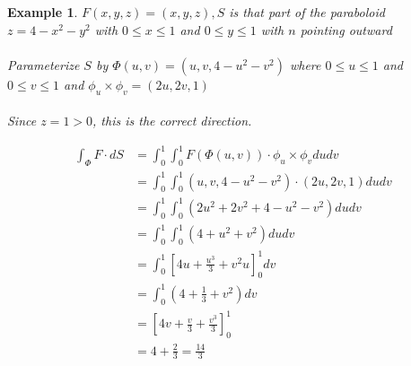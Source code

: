 \documentclass[12pt]{article}
\theoremstyle{plain}
\newtheorem{example}[theorem]{Example}
\theoremstyle{definition}
\begin{document}
\begin{example}
	$F(x,y,z) = (x,y,z), S$ is that part of the paraboloid $z=4-x^2-y^2$ with $0 \leq x \leq 1$ and $0 \leq y \leq 1$ with $n$ pointing outward\\
	\\
	Parameterize $S$ by $\Phi (u,v) = (u,v, 4-u^2-v^2)$ where $0 \leq u \leq 1$ and $0 \leq v \leq 1$ and $\phi_u \times \phi_v = (2u, 2v, 1)$\\
	\\
	Since $z=1 > 0$, this is the correct direction.

	\begin{align*}
		\int_\Phi F \cdot dS &= \int_0^1 \int_0^1 F(\Phi (u,v)) \cdot \phi_u \times \phi_v dudv\\
		&= \int_0^1 \int_0^1 (u,v,4-u^2-v^2) \cdot (2u, 2v, 1) dudv\\
		&= \int_0^1 \int_0^1 (2u^2 + 2v^2 + 4-u^2-v^2)dudv\\
		&= \int_0^1 \int_0^1 (4+u^2+v^2) dudv\\
		&= \int_0^1 [4u+ \frac{u^3}{3} + v^2 u]^1_0 dv\\
		&= \int_0^1 (4+\frac{1}{3} + v^2)dv\\
		&=[4v + \frac{v}{3} + \frac{v^3}{3}]_0^1\\
		&= 4 + \frac{2}{3} = \frac{14}{3}
	\end{align*}

\end{example}
\end{document}
